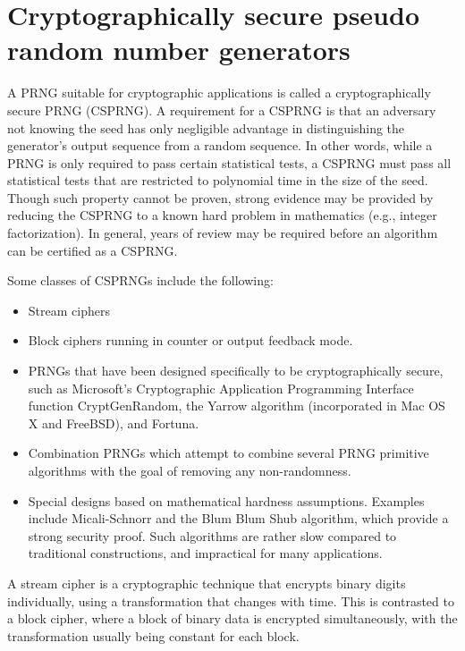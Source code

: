 \section{Cryptographically secure pseudo random number generators}


A PRNG suitable for cryptographic applications is called a cryptographically secure PRNG (CSPRNG). A requirement for a CSPRNG is that an adversary not knowing the seed has only negligible advantage in distinguishing the generator's output sequence from a random sequence. In other words, while a PRNG is only required to pass certain statistical tests, a CSPRNG must pass all statistical tests that are restricted to polynomial time in the size of the seed. Though such property cannot be proven, strong evidence may be provided by reducing the CSPRNG to a known hard problem in mathematics (e.g., integer factorization). In general, years of review may be required before an algorithm can be certified as a CSPRNG.

Some classes of CSPRNGs include the following:
\begin{itemize}

\item     Stream ciphers
\item     Block ciphers running in counter or output feedback mode.
\item     PRNGs that have been designed specifically to be cryptographically secure, such as Microsoft's Cryptographic 
 Application Programming Interface function CryptGenRandom, the Yarrow algorithm (incorporated in Mac OS X and FreeBSD), and Fortuna.
\item     Combination PRNGs which attempt to combine several PRNG primitive algorithms with the goal of removing any non-randomness.
\item     Special designs based on mathematical hardness assumptions. Examples include Micali-Schnorr and the Blum Blum Shub algorithm, which provide a strong security proof. Such algorithms are rather slow compared to traditional constructions, and impractical for many applications.
 
\end{itemize}
A stream cipher is a cryptographic technique that encrypts binary digits individually, using a transformation that changes with time. This is contrasted to a block cipher, where a block of binary data is encrypted simultaneously, with the transformation usually being constant for each block.

